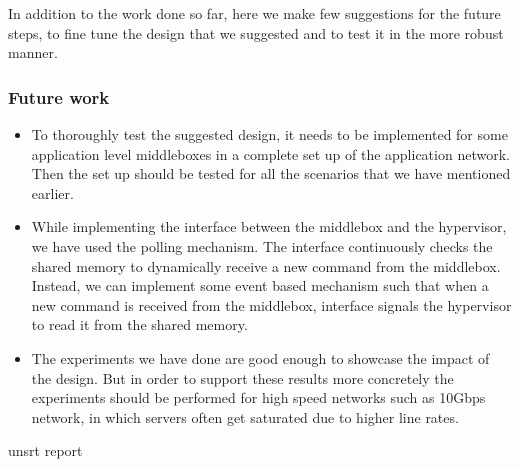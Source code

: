 \documentclass[a4paper,11pt]{report}
\begin{document}
In addition to the work done so far, here we make few suggestions for the future steps, to fine tune the design that we suggested and to test it in the more robust manner.   
\subsubsection{Future work}
\begin{itemize}
\item To thoroughly test the suggested design, it needs to be implemented for some application level middleboxes in a complete set up of the application network. Then the set up should be tested for all the scenarios that we have mentioned earlier.
\item While implementing the interface between the middlebox and the hypervisor, we have used the polling mechanism. The interface continuously checks the shared memory to dynamically receive a new command from the middlebox. Instead, we can implement some event based mechanism such that when a new command is received from the middlebox, interface signals the hypervisor to read it from the shared memory.
\item The experiments we have done are good enough to showcase the impact of the design. But in order to support these results more concretely the experiments should be performed for high speed networks such as 10Gbps network, in which servers often get saturated due to higher line rates.    
\end{itemize} 
\newpage

 {unsrt}
\nocite{*}
 {report}
\end{document}
